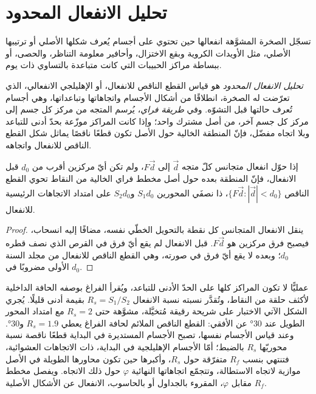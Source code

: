 \section{تحليل الانفعال المحدود}\label{sec:b3:structural-analysis:strain}

تسجّل الصخرة المشوَّهة انفعالها حين تحتوي على أجسام يُعرف شكلها الأصلي أو ترتيبها الأصلي، مثل
الأويدات الكروية وبقع الاختزال، وأحافير معلومة التناظر، والحصى،
أو ببساطة مراكز الحبيبات التي كانت متباعدة بالتساوي
ذات يوم.

\begin{definition}\label{def:b3:structural-analysis:strain-analysis}
\emph{تحليل الانفعال المحدود} هو قياس
القطع الناقص للانفعال، أو الإهليلجي الانفعالي، الذي تعرّضت له الصخرة، انطلاقًا من أشكال
الأجسام واتجاهاتها وتباعداتها، وهي أجسام تُعرف حالتها قبل
التشوّه. وفي \emph{طريقة فراي}، يُرسم المتجه
من مركز كل جسم إلى مركز كل جسم آخر، من أصل مشترك واحد؛
وإذا كانت المراكز موزّعة بحدّ أدنى للتباعد وبلا اتجاه مفضّل،
فإنّ المنطقة الخالية حول الأصل تكون قطعًا ناقصًا يماثل شكل القطع الناقص للانفعال
واتجاهه.
\end{definition}

\begin{proposition}\label{prop:b3:structural-analysis:fry}
إذا حوّل انفعال متجانس كلّ متجه $\vec d$ إلى $F\vec d$، ولم تكن أيّ مركزين
أقرب من $d_0$ قبل الانفعال، فإنّ المنطقة بعده حول أصل مخطط فراي
الخالية من النقاط تحوي القطع الناقص
$\{F\vec d : |\vec d| < d_0\}$، ذا نصفَي المحورين $S_1d_0$ و$S_2d_0$ على امتداد
الاتجاهات الرئيسية للانفعال.
\end{proposition}

\begin{proof}
ينقل الانفعال المتجانس كل نقطة بالتحويل الخطّي نفسه، مضافًا إليه
انسحاب، فيصبح فرق مركزين هو $F\vec d$. قبل الانفعال لم يقع أيّ فرق
في القرص الذي نصف قطره $d_0$؛ وبعده لا يقع أيّ فرق في صورته،
وهي القطع الناقص للانفعال من مجلد السنة الأولى مضروبًا في $d_0$.
\end{proof}

عمليًّا لا تكون المراكز كلها على الحدّ الأدنى للتباعد، ويُقرأ الفراغ
بوصفه الحافة الداخلية لأكثف حلقة من النقاط، وتُقدَّر نسبته
نسبة الانفعال $R_s = S_1/S_2$ بقيمة أدنى قليلًا. يُجري الشكل الآتي الاختبار
على شريحة رقيقة مُتخيَّلة، مشوَّهة حتى $R_s = 2$ مع امتداد المحور الطويل عند
\ang{30} عن الأفقي: القطع الناقص الملائم لحافة الفراغ يعطي
$R_s = 1.9$ و\ang{30}. وعند قياس الأجسام نفسها، تصبح الأجسام المستديرة في البداية
قطعًا ناقصة نسبة محوريّها $R_s$ بالضبط؛ أمّا الأجسام الإهليلجية في البداية،
ذات الاتجاهات العشوائية، فتنتهي بنسب $R_f$ متفرّقة
حول $R_s$، وأكبرها حين تكون محاورها الطويلة في الأصل موازية
لاتجاه الاستطالة، وتتجمّع اتجاهاتها النهائية $\varphi$ حول
ذلك الاتجاه. ويفصل مخطط $R_f$ مقابل $\varphi$، المقروء بالجداول أو بالحاسوب،
الانفعال عن الأشكال الأصلية.

